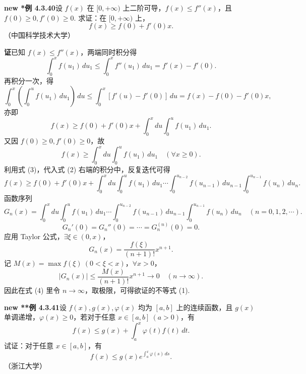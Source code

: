 \documentclass[UTF8,12pt,a4paper,fontset=fandol]{ctexart}
\begin{document}
\noindent\textbf{new *例 4.3.40}\quad 设 $f(x)$ 在 $[0,+\infty)$ 上二阶可导，$f(x)\le f''(x)$，且 $f(0)\ge0,f'(0)\ge0$. 求证：在 $[0,+\infty)$ 上，
\[
f(x)\ge f(0)+f'(0)x.
\tag{1}
\]
（中国科学技术大学）

\noindent\textbf{证}\quad 已知 $f(x)\le f''(x)$，两端同时积分得
\[
\int_0^x f(u_1)\,du_1
\le\int_0^x f''(u_1)\,du_1
=f'(x)-f'(0).
\]
再积分一次，得
\[
\int_0^x\left(\int_0^u f(u_1)\,du_1\right)\,du
\le\int_0^x[f'(u)-f'(0)]\,du
=f(x)-f(0)-f'(0)x,
\]
亦即
\[
f(x)\ge f(0)+f'(0)x+\int_0^x du\int_0^u f(u_1)\,du_1.
\tag{2}
\]
又因 $f(0)\ge0,f'(0)\ge0$，故
\[
f(x)\ge\int_0^x du\int_0^u f(u_1)\,du_1\quad(\forall x\ge0).
\tag{3}
\]
利用式 (3)，代入式 (2) 右端的积分中，反复迭代可得
\[
f(x)\ge f(0)+f'(0)x
+\int_0^x du\int_0^u f(u_1)\,du_1\cdots
\int_0^{u_{n-2}}f(u_{n-1})\,du_{n-1}\int_0^{u_{n-1}}f(u_n)\,du_n.
\tag{4}
\]
函数序列
\[
G_n(x)=\int_0^x du\int_0^u f(u_1)\,du_1\cdots
\int_0^{u_{n-2}}f(u_{n-1})\,du_{n-1}\int_0^{u_{n-1}}f(u_n)\,du_n
\quad(n=0,1,2,\cdots).
\]
\[
G_n'(0)=G_n''(0)=\cdots=G_n^{(n)}(0)=0.
\]
应用 Taylor 公式，$\exists\xi\in(0,x)$，
\[
G_n(x)=\frac{f(\xi)}{(n+1)!}x^{n+1}.
\]
记 $M(x)=\max f(\xi)\ (0<\xi<x)$，$\forall x>0$，
\[
|G_n(x)|\le\frac{M(x)}{(n+1)!}x^{n+1}\to0\quad(n\to\infty).
\]
因此在式 (4) 里令 $n\to\infty$，取极限，可得欲证的不等式 (1).

\noindent\textbf{new **例 4.3.41}\quad 设 $f(x),g(x),\varphi(x)$ 均为 $[a,b]$ 上的连续函数，且 $g(x)$ 单调递增，$\varphi(x)\ge0$，若对于任意 $x\in[a,b]\ (a>0)$，有
\[
f(x)\le g(x)+\int_a^x\varphi(t)f(t)\,dt.
\tag{1}
\]
试证：对于任意 $x\in[a,b]$，有
\[
f(x)\le g(x)e^{\int_a^x\varphi(s)\,ds}.
\tag{2}
\]
（浙江大学）
\end{document}
